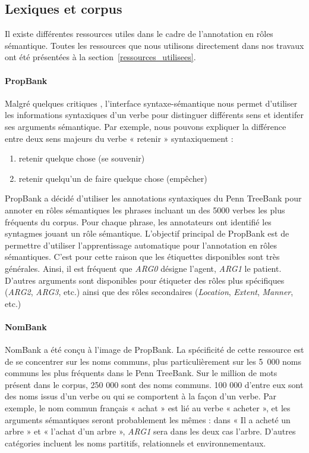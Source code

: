 \subsection{Lexiques et corpus}
\label{ressources_non_utilisees}

Il existe différentes ressources utiles dans le cadre de l'annotation en rôles
sémantique. Toutes les ressources que nous utilisons directement dans nos
travaux ont été présentées à la section~\ref{ressources_utilisees}.

\paragraph{PropBank}

Malgré quelques critiques \citep{riemer2011conception}, l'interface
syntaxe-sémantique nous permet d'utiliser les informations syntaxiques d'un
verbe pour distinguer différents sens et identifer ses arguments sémantique.
Par exemple, nous pouvons expliquer la différence entre deux sens majeurs du
verbe « retenir » syntaxiquement :

\begin{enumerate}
    \item retenir quelque chose (se souvenir)
    \item retenir quelqu'un de faire quelque chose (empêcher)
\end{enumerate}

PropBank \citep{palmer2005proposition} a décidé d'utiliser les annotations
syntaxiques du Penn TreeBank \citep{marcus1993building} pour annoter en rôles
sémantiques les phrases incluant un des 5000 verbes les plus fréquents du
corpus. Pour chaque phrase, les annotateurs ont identifié les syntagmes jouant
un rôle sémantique. L'objectif principal de PropBank est de permettre
d'utiliser l'apprentissage automatique pour l'annotation en rôles sémantiques.
C'est pour cette raison que les étiquettes disponibles sont très générales.
Ainsi, il est fréquent que \textit{ARG0} désigne l'agent, \textit{ARG1} le
patient. D'autres arguments sont disponibles pour étiqueter des rôles plus
spécifiques (\textit{ARG2}, \textit{ARG3}, etc.) ainsi que des rôles
secondaires (\textit{Location}, \textit{Extent}, \textit{Manner}, etc.)

\paragraph{NomBank}

NomBank \citep{meyers2004nombank} a été conçu à l'image de PropBank. La
spécificité de cette ressource est de se concentrer sur les noms communs, plus
particulièrement sur les 5~000 noms communs les plus fréquents dans le Penn
TreeBank. Sur le million de mots présent dans le corpus, 250 000 sont des noms
communs. 100 000 d'entre eux sont des noms issus d'un verbe ou qui se
comportent à la façon d'un verbe. Par exemple, le nom commun français « achat »
est lié au verbe « acheter », et les arguments sémantiques seront probablement
les mêmes : dans « Il a acheté un arbre » et « l'achat d'un arbre »,
\textit{ARG1} sera dans les deux cas l'arbre. D'autres catégories incluent les
noms partitifs, relationnels et environnementaux.


